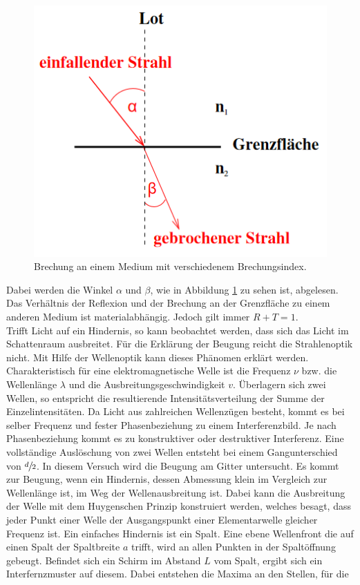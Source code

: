 \begin{figure}
    \centering
    \caption{Brechung an einem Medium mit verschiedenem Brechungsindex.\cite{V400}}
    \label{fig:brech}
    \includegraphics[width = 0.6 \textwidth]{pics/brechung.png}
\end{figure}
Dabei werden die Winkel $\alpha$ und $\beta$, wie in Abbildung \ref{fig:brech} zu sehen ist, abgelesen.
Das Verhältnis der Reflexion und der Brechung an der Grenzfläche zu einem anderen Medium ist materialabhängig. Jedoch gilt immer $R+T=1$.
\\
Trifft Licht auf ein Hindernis, so kann beobachtet werden, dass sich das Licht im Schattenraum ausbreitet.
Für die Erklärung der Beugung reicht die Strahlenoptik nicht. Mit Hilfe der Wellenoptik kann dieses Phänomen erklärt werden.
Charakteristisch für eine elektromagnetische Welle ist die Frequenz $\nu$ bzw. die Wellenlänge $\lambda$ und die Ausbreitungsgeschwindigkeit $v$.
Überlagern sich zwei Wellen, so entspricht die resultierende Intensitätsverteilung der Summe der Einzelintensitäten. Da Licht aus zahlreichen Wellenzügen besteht, kommt es bei selber Frequenz und fester Phasenbeziehung
zu einem Interferenzbild. Je nach Phasenbeziehung kommt es zu konstruktiver oder destruktiver Interferenz. Eine vollständige Auslöschung von zwei Wellen entsteht bei einem Gangunterschied von $\sfrac{d}{2}$.
In diesem Versuch wird die Beugung am Gitter untersucht. Es kommt zur Beugung, wenn ein Hindernis, dessen Abmessung klein im Vergleich zur Wellenlänge ist, im Weg der Wellenausbreitung ist.
Dabei kann die Ausbreitung der Welle mit dem Huygenschen Prinzip konstruiert werden, welches besagt, dass jeder Punkt einer Welle der Ausgangspunkt einer Elementarwelle gleicher Frequenz ist.
Ein einfaches Hindernis ist ein Spalt. Eine ebene Wellenfront die auf einen Spalt der Spaltbreite $a$ trifft, wird an allen Punkten in der Spaltöffnung gebeugt.
Befindet sich ein Schirm im Abstand $L$ vom Spalt, ergibt sich ein Interfernzmuster auf diesem. Dabei entstehen die Maxima an den Stellen, für die
